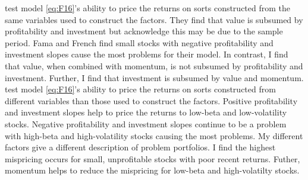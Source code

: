 \textcite{fama2015five} test model \ref{eq:F16}'s ability
to price the returns on sorts constructed from the same variables
used to construct the factors.
They find that value is subsumed by profitability and investment but
acknowledge this may be due to the sample period.
Fama and French find small stocks with negative profitability and investment
slopes cause the most problems for their model.
In contrast, I find that value, when combined with momentum, is not subsumed by
profitability and investment.
Further, I find that investment is subsumed by value and momentum.
\textcite{fama2016dissecting} test model \ref{eq:F16}'s ability
to price the returns on sorts constructed from different variables than those
used to construct the factors.
Positive profitability and investment slopes help to price the returns to
low-beta and low-volatility stocks.
Negative profitability and investment slopes continue to be a problem with
high-beta and high-volatility stocks causing the most problems.
My different factors give a different description of problem portfolios.
I find the highest mispricing occurs for small, unprofitable stocks with poor
recent returns.
Futher, momentum helps to reduce the mispricing for low-beta and high-volatilty
stocks.



